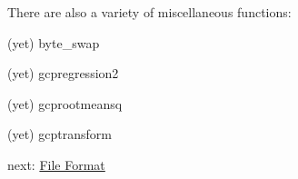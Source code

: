 There are also a variety of miscellaneous functions\+: \begin{DoxyItemize}
\item (yet) byte\+\_\+swap \item (yet) gcpregression2 \item (yet) gcprootmeansq \item (yet) gcptransform\end{DoxyItemize}
next\+: \hyperlink{file_format}{File Format} 